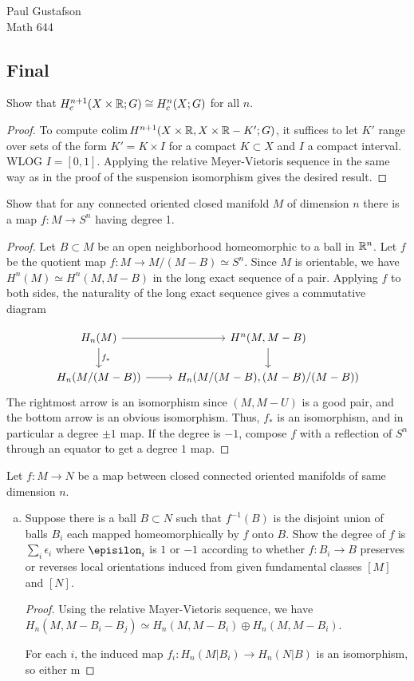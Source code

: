\documentclass{article}
\begin{document}
\noindent Paul Gustafson\\
\noindent Math 644

\subsection*{Final}
 Show that $H_c^{n+1}(X \times \mathbb{R}; G) \cong H_c^n(X; G)$ for all $n$.
\begin{proof}
To compute $\operatorname{colim} H^{n+1}(X \times \mathbb{R}, X \times \mathbb{R} - K'; G)$, it suffices to let $K'$ range over sets of the form $K' = K \times I$ for a compact $K \subset X$ and $I$ a compact interval. WLOG $I = [0,1]$.  Applying the relative Meyer-Vietoris sequence in the same way as in the proof of the suspension isomorphism gives the desired result.
\end{proof}

 Show that for any connected oriented closed manifold $M$ of dimension $n$ there is a map $f : M \to S^n$ having degree 1.
\begin{proof}
Let $B \subset M$ be an open neighborhood homeomorphic to a ball in $\mathbb{R}^n$.  Let $f$ be the quotient map $f: M \to M/(M-B) \simeq S^n$.
Since $M$ is orientable, we have $H^n(M) \simeq H^n(M, M - B)$ in the long exact sequence of a pair. Applying $f$ to both sides, the 
naturality of the long exact sequence gives a commutative diagram

\[
\begin{tikzcd}
H_n(M) \arrow{r} \arrow{d}{f_*} &  H^n(M, M - B) \arrow{d} \\
H_n(M/(M - B)) \arrow{r} & H_n(M/(M - B), (M - B)/(M - B))
\end{tikzcd}
\]
The rightmost arrow is an isomorphism since $(M, M-U)$ is a good pair, and the bottom arrow is an obvious isomorphism.  Thus, $f_*$ is an isomorphism, and in particular a degree $\pm 1$ map. If the degree is $-1$, compose $f$ with a reflection of $S^n$ through an equator to get a degree $1$ map.
\end{proof}

 Let $f : M \to N$ be a map between closed connected oriented manifolds of same dimension $n$.
\begin{enumerate}[a.]
\item Suppose there is a ball $B \subset N$ such that $f^{-1}(B)$ is the disjoint union of balls $B_i$ each 
mapped homeomorphically by $f$ onto $B$. Show the degree of $f$ is $\sum_i \epsilon_i$ where $\episilon_i$
is $1$ or $-1$ according to whether $f:B_i \to B$ preserves or reverses local orientations induced from
given fundamental classes $[M]$ and $[N]$.
\begin{proof} 
Using the relative Mayer-Vietoris sequence, we have $H_n(M, M- B_i -B_j) \simeq H_n(M, M- B_i) \oplus H_n(M, M- B_i)$.

For each $i$, the induced map $f_i: H_n(M|B_i) \to H_n(N|B)$ is an isomorphism, so either m
\end{proof}

\end{enumerate}
\end{document}

